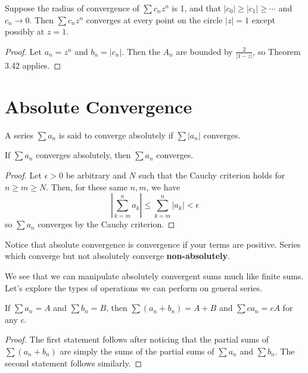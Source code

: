 \begin{theorem} %
Suppose the radius of convergence of $\sum c_nz^n$ is 1, and that $|c_0| \ge |c_1| \ge \dotsb$ and $c_n \to 0$. Then $\sum c_nz^n$ converges at every point on the circle $|z| = 1$ except possibly at $z = 1$.

\begin{proof}
Let $a_n = z^n$ and $b_n = |c_n|$. Then the $A_n$ are bounded by $\frac{2}{|1 - z|}$, so Theorem 3.42 applies.
\end{proof}
\end{theorem}

\section{Absolute Convergence}

A series $\sum a_n$ is said to converge absolutely if $\sum |a_n|$ converges.

\begin{theorem} %
If $\sum a_n$ converges absolutely, then $\sum a_n$ converges.

\begin{proof}
Let $\epsilon > 0$ be arbitrary and $N$ such that the Cauchy criterion holds for $n \ge m \ge N$. Then, for these same $n, m$, we have
\[
	\left| \sum_{k=m}^{n} a_k \right| \le \sum_{k=m}^{n} |a_k| < \epsilon
\]
so $\sum a_n$ converges by the Cauchy criterion.
\end{proof}
\end{theorem}

Notice that absolute convergence is convergence if your terms are positive. Series which converge but not absolutely converge \textbf{non-absolutely}.

We see that we can manipulate absolutely convergent sums much like finite sums. Let's explore the types of operations we can perform on general series.

\begin{theorem} %
If $\sum a_n = A$ and $\sum b_n = B$, then $\sum (a_n + b_n) = A + B$ and $\sum ca_n = cA$ for any $c$.

\begin{proof}
The first statement follows after noticing that the partial sums of $\sum (a_n + b_n)$ are simply the sums of the partial sums of $\sum a_n$ and $\sum b_n$. The second statement follows similarly.
\end{proof}
\end{theorem}

